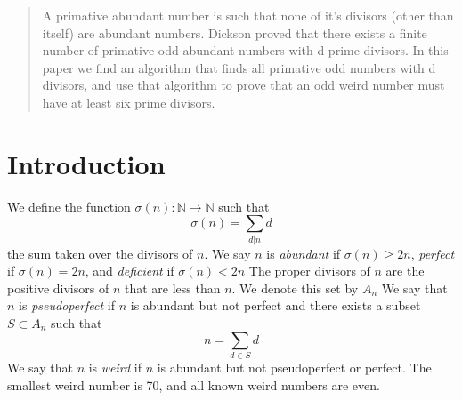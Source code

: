 \documentclass[../paper.tex]{article}
\begin{document}
\begin{abstract}
A primative abundant number is such that none of it's 
divisors (other than itself) are abundant numbers. Dickson proved
that there exists a finite number of primative odd abundant 
numbers with d prime divisors. In this paper we find an algorithm 
that finds all primative odd numbers with d divisors, and use that
algorithm to prove that an odd weird number must have at least six 
prime divisors.

\end{abstract}

\section{Introduction}
We define the function 
%
$\sigma(n):\mathbb{N} \rightarrow \mathbb{N}$
%
such that
%
$$\sigma(n) = \sum_{d|n}d$$
%
the sum taken over the divisors of $n$. We say $n$ is 
\textit{abundant} if $\sigma(n) \geq 2n$, \textit{perfect} if 
$\sigma(n) = 2n$, and \textit{deficient} if $\sigma(n) < 2n$ The 
proper divisors of $n$ are the positive divisors of $n$ that are
less than $n$. We denote this set by $\textit{A}_{n}$
%
We say that $n$ is \textit{pseudoperfect} if $n$ is abundant 
but not perfect and there exists a subset 
$ S \subset \textit{A}_{n}$ such that
%
$$ n = \sum_{d \in S} d$$
%
We say that $n$ is \textit{weird} if $n$ is abundant but not 
pseudoperfect or perfect. The smallest weird number is 70, and 
all known weird numbers are even.
\end{document}
